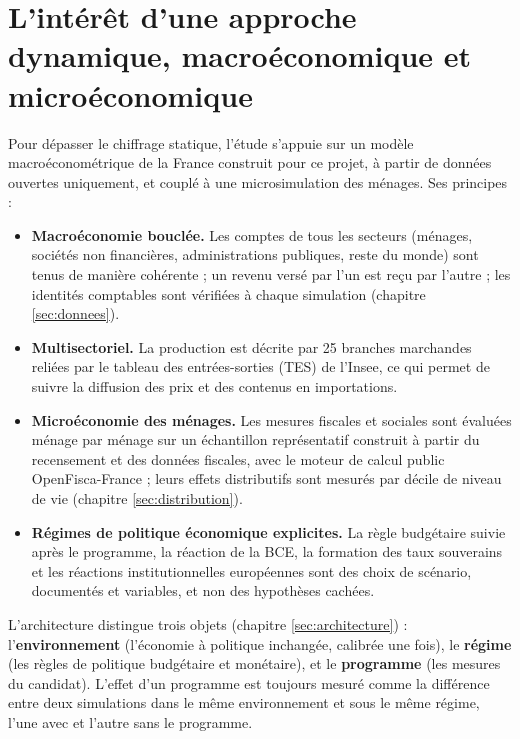 \documentclass[
  11pt,
  11pt,
  a4paper,
  openany]{book}
\providecommand{\tightlist}{%
  \setlength{\itemsep}{0pt}\setlength{\parskip}{0pt}}
\begin{document}
\hypertarget{sec:approche}{%
\section{L'intérêt d'une approche dynamique, macroéconomique et
microéconomique}\label{sec:approche}}

Pour dépasser le chiffrage statique, l'étude s'appuie sur un modèle
macroéconométrique de la France construit pour ce projet, à partir de
données ouvertes uniquement, et couplé à une microsimulation des
ménages. Ses principes :

\begin{itemize}
\tightlist
\item
  \textbf{Macroéconomie bouclée.} Les comptes de tous les secteurs
  (ménages, sociétés non financières, administrations publiques, reste
  du monde) sont tenus de manière cohérente ; un revenu versé par l'un
  est reçu par l'autre ; les identités comptables sont vérifiées à
  chaque simulation (chapitre \ref{sec:donnees}).
\item
  \textbf{Multisectoriel.} La production est décrite par 25 branches
  marchandes reliées par le tableau des entrées-sorties (TES) de
  l'Insee, ce qui permet de suivre la diffusion des prix et des contenus
  en importations.
\item
  \textbf{Microéconomie des ménages.} Les mesures fiscales et sociales
  sont évaluées ménage par ménage sur un échantillon représentatif
  construit à partir du recensement et des données fiscales, avec le
  moteur de calcul public OpenFisca-France ; leurs effets distributifs
  sont mesurés par décile de niveau de vie (chapitre
  \ref{sec:distribution}).
\item
  \textbf{Régimes de politique économique explicites.} La règle
  budgétaire suivie après le programme, la réaction de la BCE, la
  formation des taux souverains et les réactions institutionnelles
  européennes sont des choix de scénario, documentés et variables, et
  non des hypothèses cachées.
\end{itemize}

L'architecture distingue trois objets (chapitre \ref{sec:architecture})
: l'\textbf{environnement} (l'économie à politique inchangée, calibrée
une fois), le \textbf{régime} (les règles de politique budgétaire et
monétaire), et le \textbf{programme} (les mesures du candidat). L'effet
d'un programme est toujours mesuré comme la différence entre deux
simulations dans le même environnement et sous le même régime, l'une
avec et l'autre sans le programme.
\end{document}
